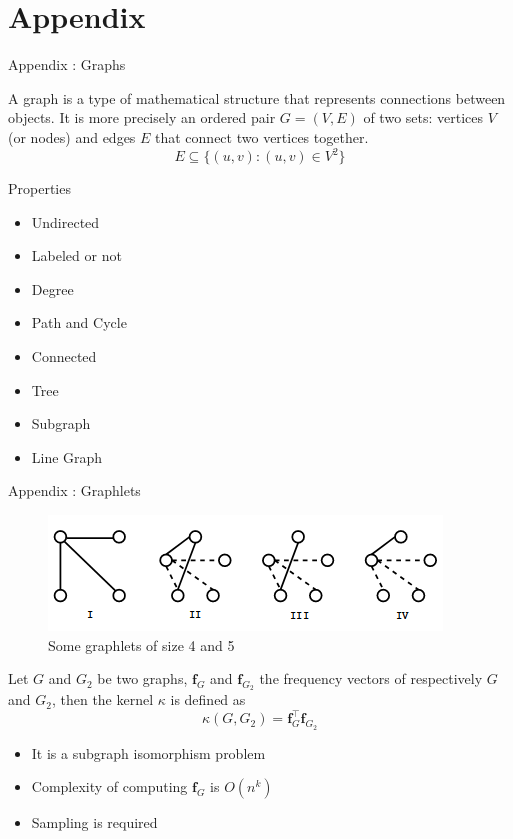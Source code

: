 \documentclass[compress]{beamer}
\let\vec\mathbf
\begin{document}
\appendix
\section[]{Appendix}
\begin{frame}[noframenumbering]{Appendix : Graphs}
\begin{definition}
	A graph\cite{bondy1976graph} is a type of mathematical structure that represents connections between objects. It is more precisely an ordered pair $G=(V,E)$ of two sets: vertices $V$ (or nodes) and edges $E$ that connect two vertices together.
	\begin{equation*}
	E \subseteq \{(u,v) : (u,v) \in V^2\}
	\end{equation*}
\end{definition}
\begin{block}{Properties}
	\begin{multicols}{2}
		\begin{itemize}
			\item Undirected
			\item Labeled or not
			\item Degree
			\item Path and Cycle
		\end{itemize}
		\begin{itemize}
			\item Connected
			\item Tree
			\item Subgraph
			\item Line Graph
		\end{itemize}
	\end{multicols}
\end{block}
\end{frame}
\begin{frame}[noframenumbering]{Appendix : Graphlets}
\begin{figure}
\includegraphics[width=\linewidth]{data/graphlets.png}
\caption*{Some graphlets of size 4 and 5 \citep{shervashidze_efficient_2009}}
\end{figure}
\begin{definition}
Let $G$ and $G_2$ be two graphs, $\vec{f}_G$ and $\vec{f}_{G_2}$ the frequency vectors of respectively $G$ and $G_2$, then the kernel $\kappa$ is defined as
\begin{equation*}
\kappa(G,G_{2})=\vec{f}_{G}^{\top}\vec{f}_{G_2}
\end{equation*}
\end{definition}
\begin{itemize}
	\item It is a subgraph isomorphism problem
\item Complexity of computing $\vec{f}_G$ is $O(n^k)$
\item Sampling is required	
\end{itemize}
\end{frame}
\end{document}
